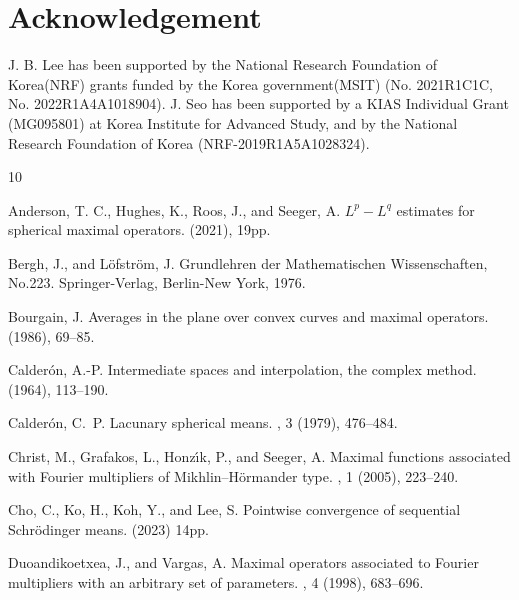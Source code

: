 \documentclass[11pt]{amsart}
\theoremstyle{plain}
\theoremstyle{definition}
\theoremstyle{remark}
\numberwithin{equation}{section}
\begin{document}
\section*{Acknowledgement}
J. B. Lee has been supported by the National Research Foundation of Korea(NRF) grants funded by the Korea government(MSIT) (No. 2021R1C1C, No. 2022R1A4A1018904).
J. Seo has been supported by a KIAS Individual Grant (MG095801) at Korea Institute for Advanced Study, and by the National Research Foundation of Korea (NRF-2019R1A5A1028324).






%

\begin{thebibliography}{10}

{\sc Anderson, T. C., Hughes, K., Roos, J., and Seeger, A.}
\newblock $L^p-L^q$ estimates for spherical maximal operators.
 (2021), 19pp.

{\sc Bergh, J., and L\"ofstr\"om, J.}
\newblock Grundlehren der Mathematischen Wissenschaften, No.223. Springer-Verlag, Berlin-New York, 1976.

{\sc Bourgain, J.}
\newblock Averages in the plane over convex curves and maximal operators.
 (1986), 69--85.

{\sc Calder\'{o}n, A.-P.}
\newblock Intermediate spaces and interpolation, the complex method.
 (1964), 113--190.

{\sc Calder\'{o}n, C.~P.}
\newblock Lacunary spherical means.
, 3 (1979), 476--484.

{\sc Christ, M., Grafakos, L., Honz\'{\i}k, P., and Seeger, A.}
\newblock Maximal functions associated with {F}ourier multipliers of {M}ikhlin--{H}\"{o}rmander type.
, 1 (2005), 223--240.

{\sc Cho, C., Ko, H., Koh, Y., and Lee, S.}
\newblock Pointwise convergence of sequential Schr\"odinger means.
 (2023) 14pp.

{\sc Duoandikoetxea, J., and Vargas, A.}
\newblock Maximal operators associated to {F}ourier multipliers with an arbitrary set of parameters.
, 4 (1998), 683--696.


\end{thebibliography}
\end{document}
